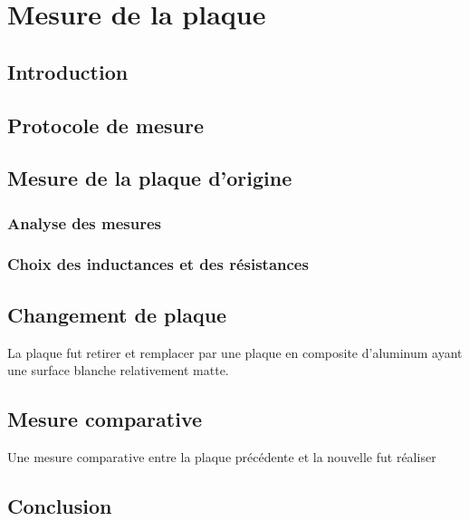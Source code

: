 \chapter{Mesure de la plaque}

\section{Introduction}

\section{Protocole de mesure}


\section{Mesure de la plaque d'origine}

\subsection{Analyse des mesures}

\subsection{Choix des inductances et des résistances}

\section{Changement de plaque}
La plaque fut retirer et remplacer par une plaque en composite d'aluminum ayant une surface blanche relativement matte.

\section{Mesure comparative}
Une mesure comparative entre la plaque précédente et la nouvelle fut réaliser

\section{Conclusion}